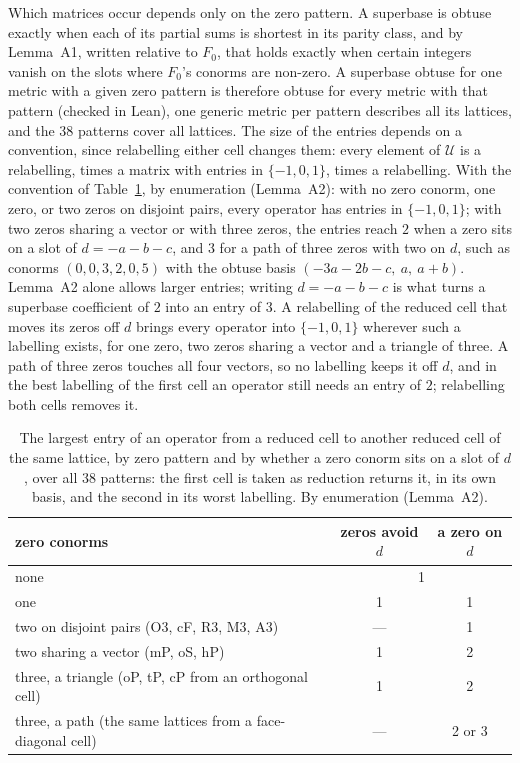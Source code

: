 Which matrices occur depends only on the zero pattern. A superbase is obtuse exactly when each of its partial sums is shortest in its parity class, and by Lemma~A1, written relative to $F_0$, that holds exactly when certain integers vanish on the slots where $F_0$'s conorms are non-zero. A superbase obtuse for one metric with a given zero pattern is therefore obtuse for every metric with that pattern (checked in Lean), one generic metric per pattern describes all its lattices, and the 38 patterns cover all lattices. The size of the entries depends on a convention, since relabelling either cell changes them: every element of $\mathcal U$ is a relabelling, times a matrix with entries in $\{-1,0,1\}$, times a relabelling. With the convention of Table~\ref{tab:entries}, by enumeration (Lemma~A2): with no zero conorm, one zero, or two zeros on disjoint pairs, every operator has entries in $\{-1,0,1\}$; with two zeros sharing a vector or with three zeros, the entries reach $2$ when a zero sits on a slot of $d=-a-b-c$, and $3$ for a path of three zeros with two on $d$, such as conorms $(0,0,3,2,0,5)$ with the obtuse basis $(-3a-2b-c,\ a,\ a+b)$. Lemma~A2 alone allows larger entries; writing $d=-a-b-c$ is what turns a superbase coefficient of $2$ into an entry of $3$. A relabelling of the reduced cell that moves its zeros off $d$ brings every operator into $\{-1,0,1\}$ wherever such a labelling exists, for one zero, two zeros sharing a vector and a triangle of three. A path of three zeros touches all four vectors, so no labelling keeps it off $d$, and in the best labelling of the first cell an operator still needs an entry of $2$; relabelling both cells removes it.

\begin{table}
\caption{The largest entry of an operator from a reduced cell to another reduced cell of the same lattice, by zero pattern and by whether a zero conorm sits on a slot of $d$, over all 38 patterns: the first cell is taken as reduction returns it, in its own basis, and the second in its worst labelling. By enumeration (Lemma~A2).}
\label{tab:entries}
\begin{footnotesize}
\begin{tabular}{>{\raggedright\arraybackslash}p{4.9cm}cc}
\toprule
zero conorms & \shortstack{zeros\\avoid $d$} & \shortstack{a zero\\on $d$} \\
\midrule
none & \multicolumn{2}{c}{1} \\
one & 1 & 1 \\
two on disjoint pairs (O3, cF, R3, M3, A3) & --- & 1 \\
two sharing a vector (mP, oS, hP) & 1 & 2 \\
three, a triangle (oP, tP, cP from an orthogonal cell) & 1 & 2 \\
three, a path (the same lattices from a face-diagonal cell) & --- & 2 or 3 \\
\bottomrule
\end{tabular}
\end{footnotesize}
\end{table}

